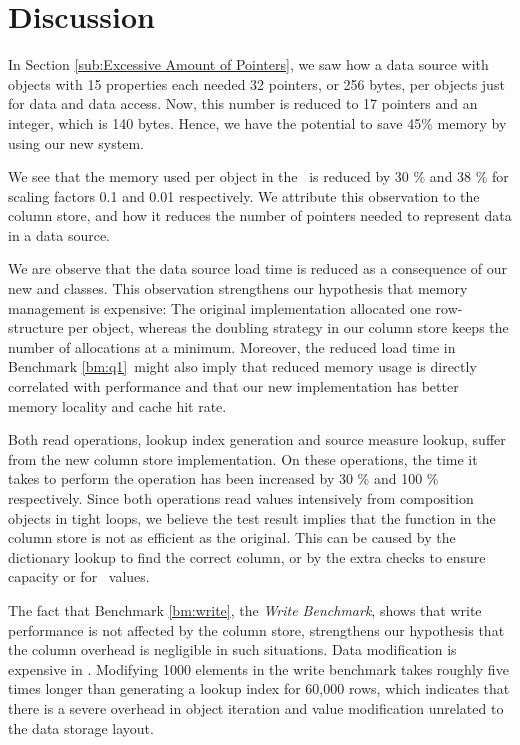 \section{Discussion}
\label{sec:Discussion}
In Section \ref{sub:Excessive Amount of Pointers}, we saw how a data source with objects with 15 properties each needed 32 pointers, or 256 bytes, per objects just for data and data access. Now, this number is reduced to 17 pointers and an integer, which is 140 bytes. Hence, we have the potential to save 45\% memory by using our new system.

We see that the memory used per object in the \tpchdl~is reduced by 30 \% and 38 \% for scaling factors 0.1 and 0.01 respectively. We attribute this observation to the column store, and how it reduces the number of pointers needed to represent data in a data source. 

We are observe that the data source load time is reduced as a consequence of our new  and  classes. This observation strengthens our hypothesis that memory management is expensive: The original implementation allocated one row-structure per object, whereas the doubling strategy in our column store keeps the number of allocations at a minimum. Moreover, the reduced load time in Benchmark \ref{bm:q1}~might also imply that reduced memory usage is directly correlated with performance and that our new implementation has better memory locality and cache hit rate.

Both read operations, lookup index generation and source measure lookup, suffer from the new column store implementation. On these operations, the time it takes to perform the operation has been increased by 30 \% and 100 \% respectively. Since both operations read values intensively from composition objects in tight loops, we believe the test result implies that the  function in the column store is not as efficient as the original. This can be caused by the dictionary lookup to find the correct column, or by the extra checks to ensure capacity or for \nil~values.

The fact that Benchmark \ref{bm:write}, the \textit{Write Benchmark}, shows that write performance is not affected by the column store, strengthens our hypothesis that the column overhead is negligible in such situations. Data modification is expensive in \gap. Modifying 1000 elements in the write benchmark takes roughly five times longer than generating a lookup index for 60,000 rows, which indicates that there is a severe overhead in object iteration and value modification unrelated to the data storage layout.

